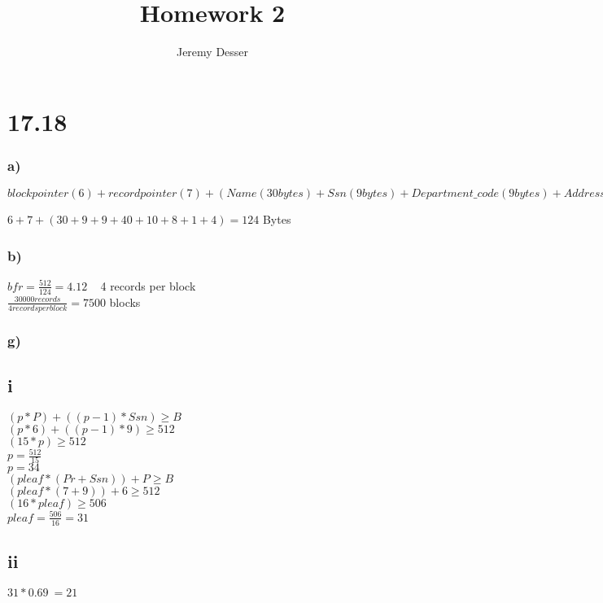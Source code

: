\documentclass[11pt]{article}
\theoremstyle{plain}
\theoremstyle{definition}
\begin{document}
 


\title{Homework 2}
\author{Jeremy Desser}
\begin{titlepage}
\maketitle
\end{titlepage}



\section*{17.18}
\subsubsection*{a)}
$block pointer(6)+record pointer(7) +(Name (30 bytes)+Ssn (9 bytes)+ Department\_code (9 bytes)+ Address (40 bytes)+Phone (10 bytes)+
 Birth_date (8 bytes)+ Sex (1 byte)+ Job\_code (4 bytes))$
 
 $6+7+(30+9+9+40+10+8+1+4) = 124$ Bytes 
\subsubsection*{b)}
$bfr =\frac{512}{124}=4.12$ ~ 4 records per block\\
 $\frac{30000 records}{4 records per block} = 7500$ blocks
\subsubsection*{g)}
\subsection*{i}
$(p * P) + ((p − 1) * Ssn) \geq B$\\
$(p * 6) + ((p − 1) * 9) \geq 512$\\
$(15 * p) \geq 512$\\
$p = \frac{512}{15}$\\
$p=34$\\

$(pleaf * (Pr + Ssn)) + P \geq B$\\
$(pleaf * (7 + 9)) + 6 \geq 512$\\
$(16 * pleaf) \geq 506$\\
$pleaf = \frac{506}{16} = 31$\\

\subsection*{ii}
$31*0.69 ~= 21$
\end{document}
